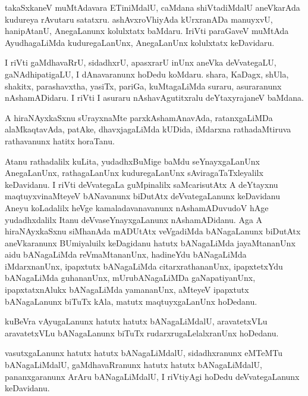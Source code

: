 \documentclass{article}
\begin{document}
\begin{mng}%
takaSxkaneV muMtAdavara ETiniMdalU, caMdana shiVtadiMdalU aneVkarAda kudureya rAvutaru satatxru. 
ashAvxroVhiyAda kUrxranADa manuyxvU, hanipAtanU, AnegaLanunx kolulxtatx baMdaru. IriVti paraGaveV 
muMtAda AyudhagaLiMda kuduregaLanUnx, AnegaLanUnx kolulxtatx keDavidaru.
\end{mng}

\begin{mng}%
I riVti gaMdhavaRrU, sidadhxrU, apasxrarU inUnx aneVka deVvategaLU, gaNAdhipatigaLU, I dAnavaranunx 
hoDedu koMdaru. shara, KaDagx, shUla, shakitx, parashavxtha, yasiTx, pariGa, kuMtagaLiMda suraru, 
asuraranunx nAshamADidaru. I riVti I asuraru nAshavAgutitxralu deYtaxyrajaneV baMdana.
\end{mng}

\begin{mng}%
A hiraNAyxkaSxnu sUrayxnaMte parxkAshamAnavAda, ratanxgaLiMDa alaMkaqtavAda, patAke, dhavxjagaLiMda 
kUDida, iMdarxna rathadaMtiruva rathavanunx hatitx horaTanu.
\end{mng}

\begin{mng}%
Atanu rathadalilx kuLita, yudadhxBuMige baMdu seYnayxgaLanUnx AnegaLanUnx, rathagaLanUnx 
kuduregaLanUnx sAviragaTaTxleyalilx keDavidanu. I  riVti deVvategaLa guMpinalilx saMcarisutAtx A 
deYtayxnu maqtuyxvinaMteyeV bANavanunx biDutAtx deVvategaLanunx keDavidanu Aneyu koLadalilx heVge 
kamaladavanavanunx nAshamADuvudoV hAge yudadhxdalilx Itanu deVvaseYnayxgaLanunx nAshamADidanu. Aga 
A hiraNAyxkaSxnu siMhanAda mADUtAtx veVgadiMda bANagaLanunx biDutAtx aneVkaranunx BUmiyaluilx 
keDagidanu hatutx bANagaLiMda jayaMtananUnx aidu bANagaLiMda reVmaMtananUnx, hadineYdu bANagaLiMda 
iMdarxnanUnx, ipapxtutx bANagaLiMda citarxrathananUnx, ipapxtetxYdu bANagaLiMda guhananUnx, 
mUrubANagaLiMDa gaNapatiyanUnx, ipapxtatxnAlukx bANagaLiMda yamananUnx, aMteyeV ipapxtutx 
bANagaLanunx biTuTx kAla, matutx maqtuyxgaLanUnx hoDedanu.
\end{mng}

\begin{mng}%
kuBeVra vAyugaLanunx hatutx hatutx bANagaLiMdalU, aravatetxVLu aravatetxVLu bANagaLanunx biTuTx 
rudarxrugaLelalxranUnx hoDedanu.
\end{mng}

\begin{mng}%
vasutxgaLanunx hatutx hatutx bANagaLiMdalU, sidadhxranunx eMTeMTu bANagaLiMdalU, gaMdhavaRranunx 
hatutx hatutx bANagaLiMdalU, pananxgaranunx ArAru bANagaLiMdalU, I riVtiyAgi hoDedu 
deVvategaLanunx keDavidanu.
\end{mng}
\end{document}
